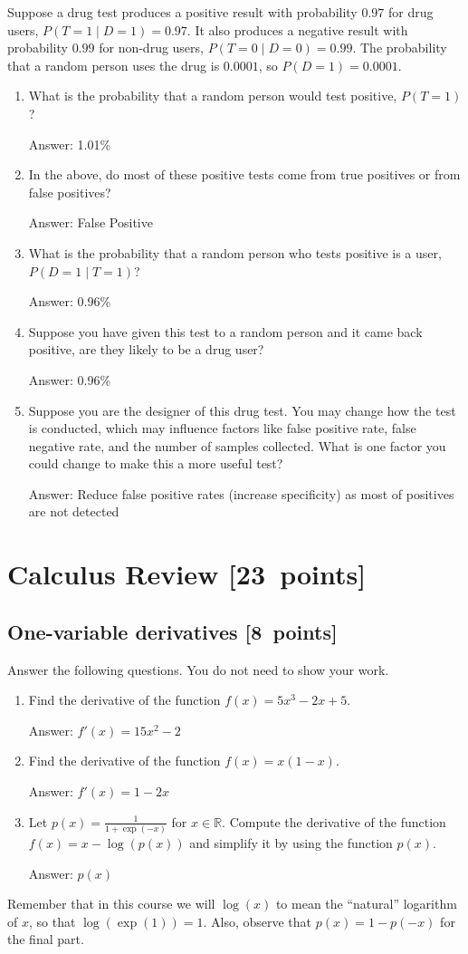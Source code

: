 \documentclass{article}
\newcommand{\blu}[1]{{\textcolor{blu}{#1}}}
\newcommand{\gre}[1]{\textcolor{gre}{#1}}
\newcommand\ans[1]{\par\gre{Answer: #1}}
\let\ask\blu
\newcommand\pts[1]{\textcolor{pointscolour}{[#1~points]}}
\def\R{\mathbb{R}}
\begin{document}
  Suppose a drug test produces a positive result with probability $0.97$ for drug users, $P(T=1 \mid D=1)=0.97$. It also produces a negative result with probability $0.99$ for non-drug users, $P(T=0 \mid D=0)=0.99$. The probability that a random person uses the drug is $0.0001$, so $P(D=1)=0.0001$.

  \begin{enumerate}
  \item What is the probability that a random person would test positive, $P(T=1)$?
  \ans{1.01\%}
  \item In the above, do most of these positive tests come from true positives or from false positives?
  \ans{False Positive}
  \item What is the probability that a random person who tests positive is a user, $P(D=1 \mid T=1)$?
  \ans{0.96\%}
  \item Suppose you have given this test to a random person and it came back positive, are they likely to be a drug user?
  \ans{0.96\%}
  \item Suppose you are the designer of this drug test. You may change how the test is conducted, which may influence factors like false positive rate, false negative rate, and the number of samples collected. What is one factor you could change to make this a more useful test?
  \ans{Reduce false positive rates (increase specificity) as most of positives are not detected}
  \end{enumerate}


  \clearpage\section{Calculus Review \pts{23}}



  \subsection{One-variable derivatives \pts{8}}
  \label{sub.one.var}

  \ask{Answer the following questions.} You do not need to show your work.

  \begin{enumerate}
  \item Find the derivative of the function $f(x) = 5x^3 -2x + 5$.
  \ans{$f'(x)=15x^{2}-2$}
  \item Find the derivative of the function $f(x) = x(1-x)$.
  \ans{$f'(x)=1-2x$}
  \item Let $p(x) = \frac{1}{1+\exp(-x)}$ for $x \in \R$. Compute the derivative of the function $f(x) = x-\log(p(x))$ and simplify it by using the function $p(x)$.
  \ans{$p(x)$}
  \end{enumerate}
  Remember that in this course we will $\log(x)$ to mean the ``natural'' logarithm of $x$, so that $\log(\exp(1)) = 1$. Also, observe that $p(x) = 1-p(-x)$ for the final part.
\end{document}
